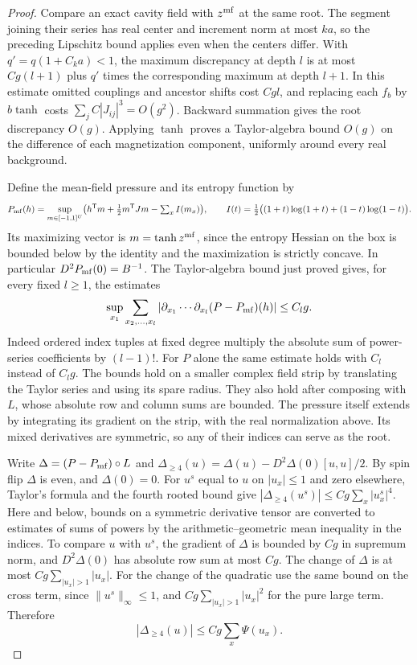 \documentclass[11pt]{article}
\theoremstyle{definition}
\begin{document}
\begin{proof}
Compare an exact cavity field with \(z^{\rm mf}\) at the same
root. The segment joining their series has real center and
increment norm at most \(ka\), so the preceding Lipschitz bound
applies even when the centers differ. With
\(q'=q(1+C_k a)<1\), the maximum discrepancy at depth \(l\)
is at most \(Cg(l+1)\) plus \(q'\) times the corresponding maximum
at depth \(l+1\). In this estimate omitted couplings and
ancestor shifts cost \(Cgl\), and replacing each \(f_b\)
by \(b\tanh\) costs \(\sum_j C|J_{ij}|^3=O(g^2)\).
Backward summation gives the root discrepancy \(O(g)\).
Applying \(\tanh\) proves a Taylor-algebra bound \(O(g)\)
on the difference of each magnetization component,
uniformly around every real background.

Define the mean-field pressure and its entropy function by
\begin{equation}
 P_{\rm mf}(h)=\sup_{m\in[-1,1]^U}
  \bigl(h^{\mathsf T}m+\tfrac12m^{\mathsf T}J m-\textstyle\sum_x I(m_x)\bigr),
 \qquad
 I(t)=\tfrac12\bigl((1+t)\log(1+t)+(1-t)\log(1-t)\bigr).
\end{equation}
Its maximizing vector is \(m=\tanh z^{\rm mf}\), since the
entropy Hessian on the box is bounded below by the identity
and the maximization is strictly concave.
In particular \(D^2P_{\rm mf}(0)=B^{-1}\).
The Taylor-algebra bound just proved gives, for every fixed
\(l\ge1\), the estimates
\begin{equation}
 \sup_{x_1}\sum_{x_2,\ldots,x_l}
    |\partial_{x_1}\cdots\partial_{x_l}(P-P_{\rm mf})(h)|
       \le C_l g .
\end{equation}
Indeed ordered index tuples at fixed degree multiply the
absolute sum of power-series coefficients by \((l-1)!\).
For \(P\) alone the same estimate holds with \(C_l\)
instead of \(C_lg\).
The bounds hold on a smaller complex field strip by
translating the Taylor series and using its spare radius.
They also hold after composing with \(L\), whose absolute
row and column sums are bounded. The pressure itself
extends by integrating its gradient on the strip,
with the real normalization above. Its mixed derivatives
are symmetric, so any of their indices can serve as the root.

Write \(\Delta=(P-P_{\rm mf})\circ L\) and
\(\Delta_{\ge4}(u)=\Delta(u)-D^2\Delta(0)[u,u]/2\).
By spin flip \(\Delta\) is even, and \(\Delta(0)=0\).
For \(u^s\) equal to \(u\) on \(|u_x|\le1\) and zero
elsewhere, Taylor's formula and the fourth rooted bound
give \(|\Delta_{\ge4}(u^s)|\le Cg\sum_x|u_x^s|^4\).
Here and below, bounds on a symmetric derivative tensor
are converted to estimates of sums of powers by the
arithmetic--geometric mean inequality in the indices.
To compare \(u\) with \(u^s\), the gradient of \(\Delta\)
is bounded by \(Cg\) in supremum norm, and \(D^2\Delta(0)\)
has absolute row sum at most \(Cg\). The change of \(\Delta\)
is at most \(Cg\sum_{|u_x|>1}|u_x|\).
For the change of the quadratic use the same bound
on the cross term, since \(\|u^s\|_\infty\le1\), and
\(Cg\sum_{|u_x|>1}|u_x|^2\) for the pure large term.
Therefore
\begin{equation}
 |\Delta_{\ge4}(u)|\le Cg\sum_x\Psi(u_x).
\end{equation}


\end{proof}
\end{document}
